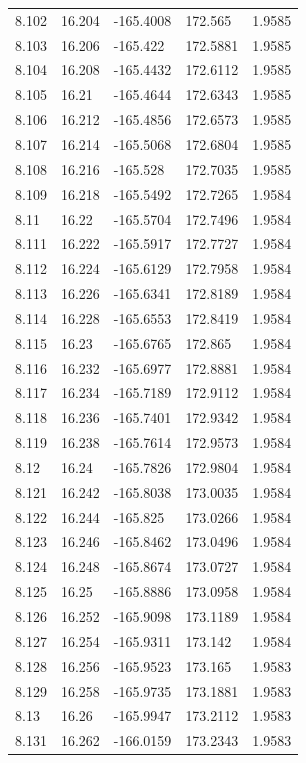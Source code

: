\begin{tabular}{lllll}
8.102 & 16.204 & -165.4008 & 172.565 & 1.9585 \\
8.103 & 16.206 & -165.422 & 172.5881 & 1.9585 \\
8.104 & 16.208 & -165.4432 & 172.6112 & 1.9585 \\
8.105 & 16.21 & -165.4644 & 172.6343 & 1.9585 \\
8.106 & 16.212 & -165.4856 & 172.6573 & 1.9585 \\
8.107 & 16.214 & -165.5068 & 172.6804 & 1.9585 \\
8.108 & 16.216 & -165.528 & 172.7035 & 1.9585 \\
8.109 & 16.218 & -165.5492 & 172.7265 & 1.9584 \\
8.11 & 16.22 & -165.5704 & 172.7496 & 1.9584 \\
8.111 & 16.222 & -165.5917 & 172.7727 & 1.9584 \\
8.112 & 16.224 & -165.6129 & 172.7958 & 1.9584 \\
8.113 & 16.226 & -165.6341 & 172.8189 & 1.9584 \\
8.114 & 16.228 & -165.6553 & 172.8419 & 1.9584 \\
8.115 & 16.23 & -165.6765 & 172.865 & 1.9584 \\
8.116 & 16.232 & -165.6977 & 172.8881 & 1.9584 \\
8.117 & 16.234 & -165.7189 & 172.9112 & 1.9584 \\
8.118 & 16.236 & -165.7401 & 172.9342 & 1.9584 \\
8.119 & 16.238 & -165.7614 & 172.9573 & 1.9584 \\
8.12 & 16.24 & -165.7826 & 172.9804 & 1.9584 \\
8.121 & 16.242 & -165.8038 & 173.0035 & 1.9584 \\
8.122 & 16.244 & -165.825 & 173.0266 & 1.9584 \\
8.123 & 16.246 & -165.8462 & 173.0496 & 1.9584 \\
8.124 & 16.248 & -165.8674 & 173.0727 & 1.9584 \\
8.125 & 16.25 & -165.8886 & 173.0958 & 1.9584 \\
8.126 & 16.252 & -165.9098 & 173.1189 & 1.9584 \\
8.127 & 16.254 & -165.9311 & 173.142 & 1.9584 \\
8.128 & 16.256 & -165.9523 & 173.165 & 1.9583 \\
8.129 & 16.258 & -165.9735 & 173.1881 & 1.9583 \\
8.13 & 16.26 & -165.9947 & 173.2112 & 1.9583 \\
8.131 & 16.262 & -166.0159 & 173.2343 & 1.9583 \\

\end{tabular}
